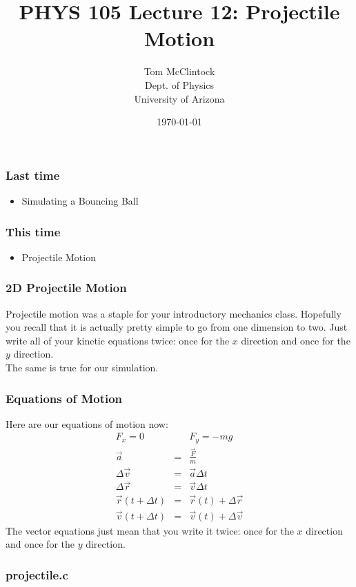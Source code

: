 \documentclass{beamer}
\title{PHYS 105 Lecture 12: Projectile Motion}
\author{Tom McClintock \\
	Dept. of Physics\\
	University of Arizona
}
\date{\today}
\begin{document}
\begin{frame}
  \titlepage
\end{frame}

\begin{frame}
  \frametitle{Last time}
  \begin{itemize}
    \item Simulating a Bouncing Ball
  \end{itemize}
\end{frame}

\begin{frame}
  \frametitle{This time}
  \begin{itemize}
    \item Projectile Motion
  \end{itemize}
\end{frame}

\begin{frame}
  \frametitle{2D Projectile Motion}
  Projectile motion was a staple for your introductory mechanics class.
  Hopefully you recall that it is actually pretty simple to go from
  one dimension to two. Just write all of your kinetic equations
  twice: once for the $x$ direction and once for the $y$ direction.\\
  The same is true for our simulation.
\end{frame}

\begin{frame}
  \frametitle{Equations of Motion}
  Here are our equations of motion now:
  \begin{eqnarray*}
    F_x = 0 && F_y = -mg\\
    \vec{a} &=& \frac{\vec{F}}{m}\\
    \Delta\vec{v} &=& \vec{a}\Delta t\\
    \Delta\vec{r} &=& \vec{v}\Delta t\\
    \vec{r}(t+\Delta t) &=& \vec{r}(t) + \Delta\vec{r}\\
    \vec{v}(t+\Delta t) &=& \vec{v}(t) + \Delta\vec{v}
  \end{eqnarray*}
  The vector equations just mean that you write it twice: once for
  the $x$ direction and once for the $y$ direction.
\end{frame}

\begin{frame}
  \frametitle{projectile.c}
  
\end{frame}
\end{document}
